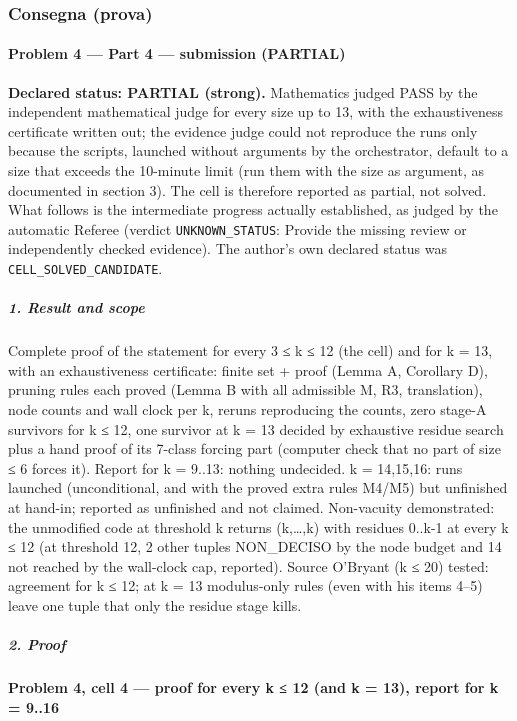 \documentclass[11pt,a4paper]{article}
\begin{document}
\subsubsection{Consegna (prova)}
\paragraph{Problem 4 --- Part 4 --- submission
(PARTIAL)}\label{problem-4-part-4-submission-partial}

\textbf{Declared status: PARTIAL (strong).} Mathematics judged PASS by
the independent mathematical judge for every size up to 13, with the
exhaustiveness certificate written out; the evidence judge could not
reproduce the runs only because the scripts, launched without arguments
by the orchestrator, default to a size that exceeds the 10-minute limit
(run them with the size as argument, as documented in section 3). The
cell is therefore reported as partial, not solved. What follows is the
intermediate progress actually established, as judged by the automatic
Referee (verdict \texttt{UNKNOWN\_STATUS}: Provide the missing review or
independently checked evidence). The author's own declared status was
\texttt{CELL\_SOLVED\_CANDIDATE}.

\subparagraph{1. Result and scope}\label{result-and-scope}

Complete proof of the statement for every 3 ≤ k ≤ 12 (the cell) and for
k = 13, with an exhaustiveness certificate: finite set + proof (Lemma A,
Corollary D), pruning rules each proved (Lemma B with all admissible M,
R3, translation), node counts and wall clock per k, reruns reproducing
the counts, zero stage-A survivors for k ≤ 12, one survivor at k = 13
decided by exhaustive residue search plus a hand proof of its 7-class
forcing part (computer check that no part of size ≤ 6 forces it). Report
for k = 9..13: nothing undecided. k = 14,15,16: runs launched
(unconditional, and with the proved extra rules M4/M5) but unfinished at
hand-in; reported as unfinished and not claimed. Non-vacuity
demonstrated: the unmodified code at threshold k returns (k,\ldots,k)
with residues 0..k-1 at every k ≤ 12 (at threshold 12, 2 other tuples
NON\_DECISO by the node budget and 14 not reached by the wall-clock cap,
reported). Source O'Bryant (k ≤ 20) tested: agreement for k ≤ 12; at k =
13 modulus-only rules (even with his items 4--5) leave one tuple that
only the residue stage kills.

\subparagraph{2. Proof}\label{proof}

\paragraph{Problem 4, cell 4 --- proof for every k ≤ 12 (and k = 13),
report for k =
9..16}\label{problem-4-cell-4-proof-for-every-k-12-and-k-13-report-for-k-9..16}
\end{document}
